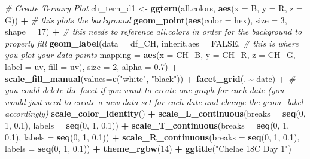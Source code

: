 \documentclass[
]{article}
\newenvironment{Shaded}{\begin{snugshade}}{\end{snugshade}}
\newcommand{\AttributeTok}[1]{\textcolor[rgb]{0.13,0.29,0.53}{#1}}
\newcommand{\CommentTok}[1]{\textcolor[rgb]{0.56,0.35,0.01}{\textit{#1}}}
\newcommand{\ConstantTok}[1]{\textcolor[rgb]{0.56,0.35,0.01}{#1}}
\newcommand{\DecValTok}[1]{\textcolor[rgb]{0.00,0.00,0.81}{#1}}
\newcommand{\FloatTok}[1]{\textcolor[rgb]{0.00,0.00,0.81}{#1}}
\newcommand{\FunctionTok}[1]{\textcolor[rgb]{0.13,0.29,0.53}{\textbf{#1}}}
\newcommand{\NormalTok}[1]{#1}
\newcommand{\OtherTok}[1]{\textcolor[rgb]{0.56,0.35,0.01}{#1}}
\newcommand{\SpecialCharTok}[1]{\textcolor[rgb]{0.81,0.36,0.00}{\textbf{#1}}}
\newcommand{\StringTok}[1]{\textcolor[rgb]{0.31,0.60,0.02}{#1}}
\begin{document}
\begin{Shaded}
\begin{Highlighting}[]
\CommentTok{\# Create Ternary Plot}
\NormalTok{ch\_tern\_d1 }\OtherTok{\textless{}{-}} \FunctionTok{ggtern}\NormalTok{(all.colors, }\FunctionTok{aes}\NormalTok{(}\AttributeTok{x =}\NormalTok{ B, }\AttributeTok{y =}\NormalTok{ R, }\AttributeTok{z =}\NormalTok{ G)) }\SpecialCharTok{+} \CommentTok{\# this plots the background}
  \FunctionTok{geom\_point}\NormalTok{(}\FunctionTok{aes}\NormalTok{(}\AttributeTok{color =}\NormalTok{ hex), }\AttributeTok{size =} \DecValTok{3}\NormalTok{, }\AttributeTok{shape =} \DecValTok{17}\NormalTok{) }\SpecialCharTok{+} \CommentTok{\# this needs to reference all.colors in order for the background to properly fill}
  \FunctionTok{geom\_label}\NormalTok{(}\AttributeTok{data =}\NormalTok{ df\_CH, }\AttributeTok{inherit.aes =} \ConstantTok{FALSE}\NormalTok{, }\CommentTok{\# this is where you plot your data points}
    \AttributeTok{mapping =} \FunctionTok{aes}\NormalTok{(}\AttributeTok{x =}\NormalTok{ CH\_B, }\AttributeTok{y =}\NormalTok{ CH\_R, }\AttributeTok{z =}\NormalTok{ CH\_G, }\AttributeTok{label =}\NormalTok{ uv, }\AttributeTok{fill =}\NormalTok{ uv),}
    \AttributeTok{size =} \DecValTok{2}\NormalTok{, }\AttributeTok{alpha =} \FloatTok{0.7}\NormalTok{) }\SpecialCharTok{+}
  \FunctionTok{scale\_fill\_manual}\NormalTok{(}\AttributeTok{values=}\FunctionTok{c}\NormalTok{(}\StringTok{"white"}\NormalTok{, }\StringTok{"black"}\NormalTok{)) }\SpecialCharTok{+}
  \FunctionTok{facet\_grid}\NormalTok{(. }\SpecialCharTok{\textasciitilde{}}\NormalTok{ date) }\SpecialCharTok{+} \CommentTok{\# you could delete the facet if you want to create one graph for each date (you would just need to create a new data set for each date and change the geom\_label accordingly)}
  \FunctionTok{scale\_color\_identity}\NormalTok{() }\SpecialCharTok{+}
  \FunctionTok{scale\_L\_continuous}\NormalTok{(}\AttributeTok{breaks =} \FunctionTok{seq}\NormalTok{(}\DecValTok{0}\NormalTok{, }\DecValTok{1}\NormalTok{, }\FloatTok{0.1}\NormalTok{), }\AttributeTok{labels =} \FunctionTok{seq}\NormalTok{(}\DecValTok{0}\NormalTok{, }\DecValTok{1}\NormalTok{, }\FloatTok{0.1}\NormalTok{)) }\SpecialCharTok{+}
  \FunctionTok{scale\_T\_continuous}\NormalTok{(}\AttributeTok{breaks =} \FunctionTok{seq}\NormalTok{(}\DecValTok{0}\NormalTok{, }\DecValTok{1}\NormalTok{, }\FloatTok{0.1}\NormalTok{), }\AttributeTok{labels =} \FunctionTok{seq}\NormalTok{(}\DecValTok{0}\NormalTok{, }\DecValTok{1}\NormalTok{, }\FloatTok{0.1}\NormalTok{)) }\SpecialCharTok{+}
  \FunctionTok{scale\_R\_continuous}\NormalTok{(}\AttributeTok{breaks =} \FunctionTok{seq}\NormalTok{(}\DecValTok{0}\NormalTok{, }\DecValTok{1}\NormalTok{, }\FloatTok{0.1}\NormalTok{), }\AttributeTok{labels =} \FunctionTok{seq}\NormalTok{(}\DecValTok{0}\NormalTok{, }\DecValTok{1}\NormalTok{, }\FloatTok{0.1}\NormalTok{)) }\SpecialCharTok{+}
  \FunctionTok{theme\_rgbw}\NormalTok{(}\DecValTok{14}\NormalTok{) }\SpecialCharTok{+} 
  \FunctionTok{ggtitle}\NormalTok{(}\StringTok{"Chelae 18C Day 1"}\NormalTok{)}
\end{Highlighting}
\end{Shaded}
\end{document}
